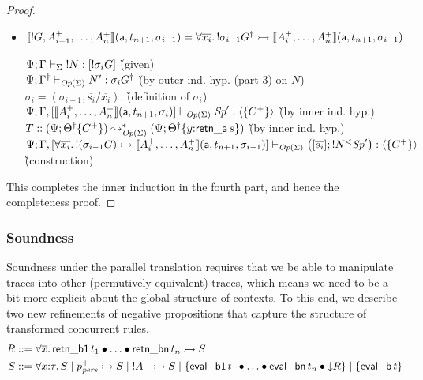 \begin{proof}
\begin{itemize}
\item $\llbracket {{!}G,A^+_{i+1},\ldots,A^+_n} \rrbracket({\sf a},{t_{n+1}},{\sigma_{i-1}}) = \forall
  \overline{x_i}.\, {!}\sigma_{i-1}{{G}^\dag} \rightarrowtail
  \llbracket {A^+_i,\ldots,A^+_n} \rrbracket({\sf a},{t_{n+1}},{\sigma_{i-1}})$

  \begin{tabbing}
  ${\Psi}; {\Gamma} \vdash_{\Sigma} {{!}{N}} : {[{!}\sigma_i{G}]}$
  \` (given) 
  \\
  ${\Psi}; {{{\Gamma}^\dag}} \vdash_{{\it Op}({\Sigma})} {N'} : {\sigma_i{{{G}^\dag}}}$
  \` (by outer ind. hyp. (part 3)  on $N$) 
  \\
  $\sigma_i = (\sigma_{i-1}, \overline{s_i}/\overline{x_i})$.
  \` (definition of $\sigma_i$)
  \\
  ${\Psi}; {\Gamma, [\llbracket {A^+_i,\ldots,A^+_n} \rrbracket({\sf a},{t_{n+1}},{\sigma_{i}})]} \vdash_{{\it Op}({\Sigma})} {{\it Sp}'} : {\langle {\{ C^+ \} } \rangle}$
  \` (by inner ind. hyp.)
  \\
  $T :: (\Psi; {{{\Theta}^\dag}}\{{C^+}\}) \leadsto^*_{{\it Op}({\Sigma})}
   (\Psi; {{{\Theta}^\dag}}\{{y{:}{\sf retn\_a}\,s}\})$
  \` (by inner ind. hyp.)
  \\
  ${\Psi}; {\Gamma, [\forall \overline{x_i}.\, {!}(\sigma_{i-1}{G})
                \rightarrowtail \llbracket {A^+_i,\ldots,A^+_n} \rrbracket({\sf a},{t_{n+1}},{\sigma_{i-1}})]} \vdash_{{\it Op}({\Sigma})} {\left([{\overline{s_i}}]; {{{!}{N}}{^{<}}{{\it Sp}'}}\right)} : {\langle {\{ C^+ \}} \rangle}$
  \\ 
  \` (construction)
  \end{tabbing}
\end{itemize}

\noindent
This completes the inner induction in the fourth part, and hence
the completeness proof.
\end{proof}

\subsubsection{Soundness}

Soundness under the parallel translation requires that we be able
to manipulate traces into other (permutively equivalent) traces, which
means we need to be a bit more explicit about the global structure of 
contexts. To this end, we describe two new refinements of negative
propositions that capture the structure of transformed concurrent
rules. 
\begin{align*}
R & ::= \forall \overline{x}.\,{\sf retn\_b1}\,t_1 \mathbin{\bullet} \ldots \mathbin{\bullet} {\sf retn\_bn}\,t_n \rightarrowtail S
\\
S & ::= \forall x{:}\tau.\,S 
   \mid p^+_{\it pers} \rightarrowtail S
   \mid {!}A^- \rightarrowtail S
   \mid \{ {\sf eval\_b1}\,t_1 \mathbin{\bullet} \ldots \mathbin{\bullet} {\sf eval\_bn}\,t_n 
           \mathbin{\bullet} {\downarrow}R \}
   \mid \{ {\sf eval\_b}\,t \} 
\end{align*}

